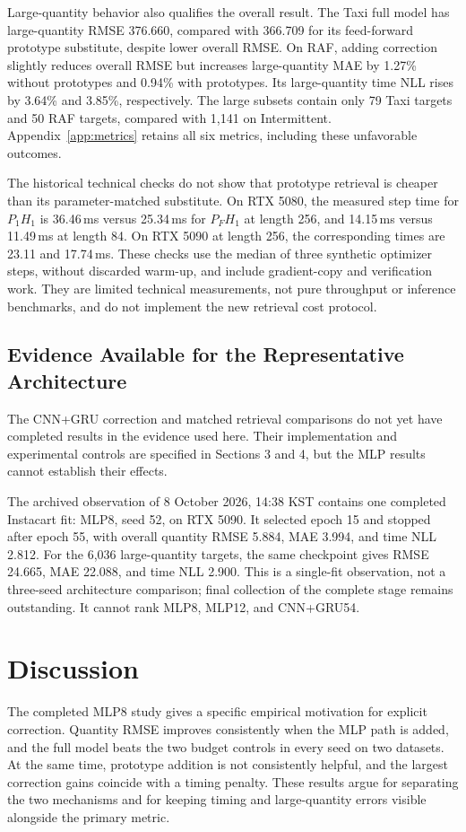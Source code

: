 \documentclass[runningheads]{llncs}
\begin{document}
Large-quantity behavior also qualifies the overall result. The Taxi full model has large-quantity RMSE 376.660, compared with 366.709 for its feed-forward prototype substitute, despite lower overall RMSE. On RAF, adding correction slightly reduces overall RMSE but increases large-quantity MAE by 1.27\% without prototypes and 0.94\% with prototypes. Its large-quantity time NLL rises by 3.64\% and 3.85\%, respectively. The large subsets contain only 79 Taxi targets and 50 RAF targets, compared with 1,141 on Intermittent. Appendix~\ref{app:metrics} retains all six metrics, including these unfavorable outcomes.

The historical technical checks do not show that prototype retrieval is cheaper than its parameter-matched substitute. On RTX 5080, the measured step time for $P_1H_1$ is 36.46\,ms versus 25.34\,ms for $P_FH_1$ at length 256, and 14.15\,ms versus 11.49\,ms at length 84. On RTX 5090 at length 256, the corresponding times are 23.11 and 17.74\,ms. These checks use the median of three synthetic optimizer steps, without discarded warm-up, and include gradient-copy and verification work. They are limited technical measurements, not pure throughput or inference benchmarks, and do not implement the new retrieval cost protocol.

\subsection{Evidence Available for the Representative Architecture}
The CNN+GRU correction and matched retrieval comparisons do not yet have completed results in the evidence used here. Their implementation and experimental controls are specified in Sections 3 and 4, but the MLP results cannot establish their effects.

The archived observation of 8 October 2026, 14:38 KST contains one completed Instacart fit: MLP8, seed 52, on RTX 5090. It selected epoch 15 and stopped after epoch 55, with overall quantity RMSE 5.884, MAE 3.994, and time NLL 2.812. For the 6,036 large-quantity targets, the same checkpoint gives RMSE 24.665, MAE 22.088, and time NLL 2.900. This is a single-fit observation, not a three-seed architecture comparison; final collection of the complete stage remains outstanding. It cannot rank MLP8, MLP12, and CNN+GRU54.

\section{Discussion}
The completed MLP8 study gives a specific empirical motivation for explicit correction. Quantity RMSE improves consistently when the MLP path is added, and the full model beats the two budget controls in every seed on two datasets. At the same time, prototype addition is not consistently helpful, and the largest correction gains coincide with a timing penalty. These results argue for separating the two mechanisms and for keeping timing and large-quantity errors visible alongside the primary metric.
\end{document}
